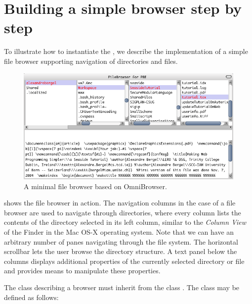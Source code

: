 \documentclass[a4paper,10pt,twoside]{book}
\begin{document}
\section{Building a simple browser step by step}


To illustrate how to instantiate the \obf, we describe the implementation of a simple file browser supporting navigation of directories and files.

\begin{figure}[!ht]
\begin{center}
\includegraphics[width=\textwidth]{filebrowser}
\caption{A minimal file browser based on OmniBrowser.} 
\end{center}
\end{figure}

 shows the file browser in action. The navigation columns in the case of a file browser are used to navigate through directories, where every column lists the contents of the directory selected in its left column, similar to the \emph{Column View} of the Finder in the Mac OS-X operating system.
Note that we can have an arbitrary number of panes navigating through the file system. The horizontal scrollbar lets the user browse the directory structure. A text panel below the columns displays additional properties of the currently selected directory or file and provides means to manipulate these properties.

The class describing a browser must inherit from the class . The class  may be defined as follows:
\end{document}

